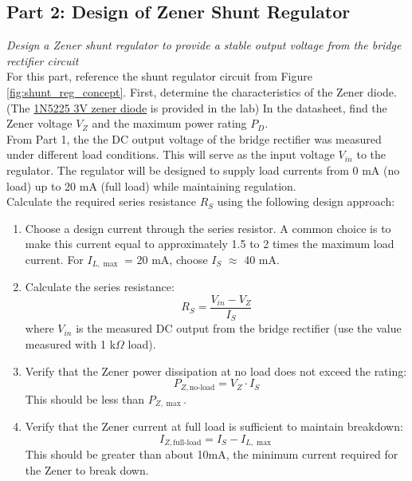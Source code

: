 \documentclass[10pt]{article}
\begin{document}
\subsection{Part 2: Design of Zener Shunt Regulator}

\emph{Design a Zener shunt regulator to provide a stable output voltage from the bridge rectifier circuit}\\

For this part, reference the shunt regulator circuit from Figure \ref{fig:shunt_reg_concept}. First, determine the characteristics of the Zener diode. (The \hyperlink{https://www.mouser.com/datasheet/3/282/1/1N5221B_1THRU1N5281B_1.pdf}{1N5225 3V zener diode} is provided in the lab) In the datasheet, find the Zener voltage $V_Z$ and the maximum power rating $P_{D}$. \\

From Part 1, the the DC output voltage of the bridge rectifier was measured under different load conditions. This will serve as the input voltage $V_{in}$ to the regulator. The regulator will be designed to supply load currents from 0 mA (no load) up to 20 mA (full load) while maintaining regulation. \\

Calculate the required series resistance $R_S$ using the following design approach:\\

\begin{enumerate}
    \item Choose a design current through the series resistor.  A common choice is to make this current equal to approximately 1.5 to 2 times the maximum load current. For $I_{L,\max}$ = 20 mA, choose $I_S$ $\approx$ 40 mA.
    
    \item Calculate the series resistance: 
    \begin{equation}
        R_S = \frac{V_{in} - V_Z}{I_S}
    \end{equation}
    where $V_{in}$ is the measured DC output from the bridge rectifier (use the value measured with 1 k$\Omega$ load).
    
    \item Verify that the Zener power dissipation at no load does not exceed the rating:
    \begin{equation}
        P_{Z,\text{no-load}} = V_Z \cdot I_S
    \end{equation}
    This should be less than $P_{Z,\max}$. 
    
    \item Verify that the Zener current at full load is sufficient to maintain breakdown:
    \begin{equation}
        I_{Z,\text{full-load}} = I_S - I_{L,\max}
    \end{equation}
    This should be greater than about 10mA, the minimum current required for the Zener to break down.
\end{enumerate}
\end{document}

